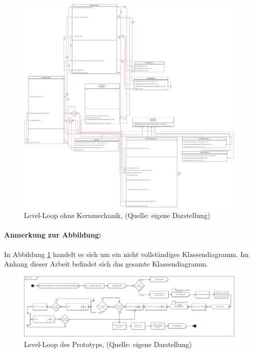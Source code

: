 \begin{figure}[ht]
\centering
\includegraphics[width=1\linewidth]{content/pictures/Level_loop_upto_character_creation.jpg}
\caption{Level-Loop ohne Kernmechanik, (Quelle: eigene Darstellung)}
\label{fig:level_game_loop_class_connectors}
\end{figure}

\paragraph{Anmerkung zur Abbildung:}
In Abbildung \ref{fig:level_game_loop_class_connectors} handelt es sich um ein nicht vollständiges Klassendiagramm. Im Anhang dieser Arbeit befindet sich das gesamte Klassendiagramm.

\begin{figure}[ht]
\centering
\includegraphics[width=1\linewidth]{content/pictures/level-loop_prototype.jpg}
\caption{Level-Loop des Prototyps, (Quelle: eigene Darstellung)}
\label{fig:level_loop_prototype}
\end{figure}

